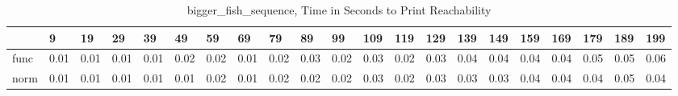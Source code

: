 \begin{table}
\centering
\caption{bigger_fish_sequence, Time in Seconds to Print Reachability}
\label{bigger_fish_sequence_states_time}
\begin{tabular}{lllllllllllllllllllll}
\toprule
{} &     9 &    19 &    29 &    39 &    49 &    59 &    69 &    79 &    89 &    99 &   109 &   119 &   129 &   139 &   149 &   159 &   169 &   179 &   189 &   199 \\
\midrule
func &  0.01 &  0.01 &  0.01 &  0.01 &  0.02 &  0.02 &  0.01 &  0.02 &  0.03 &  0.02 &  0.03 &  0.02 &  0.03 &  0.04 &  0.04 &  0.04 &  0.04 &  0.05 &  0.05 &  0.06 \\
norm &  0.01 &  0.01 &  0.01 &  0.01 &  0.01 &  0.02 &  0.01 &  0.02 &  0.02 &  0.02 &  0.03 &  0.02 &  0.03 &  0.03 &  0.03 &  0.04 &  0.04 &  0.04 &  0.05 &  0.04 \\
\bottomrule
\end{tabular}
\end{table}
